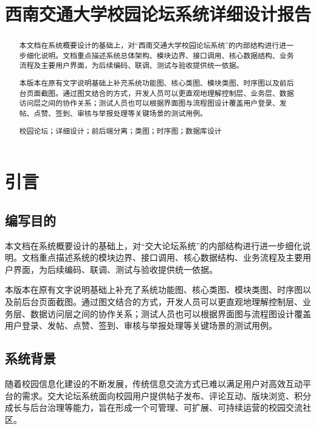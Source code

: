 \documentclass[bwprint]{report}
\title{西南交通大学校园论坛系统详细设计报告}
\begin{document}
\maketitle
\newpage

\pagestyle{plain}

\begin{abstract}
本文档在系统概要设计的基础上，对“西南交通大学校园论坛系统”的内部结构进行进一步细化说明。文档重点描述系统总体架构、模块边界、接口调用、核心数据结构、业务流程及主要用户界面，为后续编码、联调、测试与验收提供统一依据。

本版本在原有文字说明基础上补充系统功能图、核心类图、模块类图、时序图以及前后台页面截图。通过图文结合的方式，开发人员可以更直观地理解控制层、业务层、数据访问层之间的协作关系；测试人员也可以根据界面图与流程图设计覆盖用户登录、发帖、点赞、签到、审核与举报处理等关键场景的测试用例。

\vspace{0.5em}
校园论坛；详细设计；前后端分离；类图；时序图；数据库设计
\end{abstract}

\tableofcontents
\newpage
\listoffigures
\newpage
\pagestyle{plain}
\setcounter{page}{1}

\section{引言}

\subsection{编写目的}

本文档在系统概要设计的基础上，对“交大论坛系统”的内部结构进行进一步细化说明。文档重点描述系统的模块边界、接口调用、核心数据结构、业务流程及主要用户界面，为后续编码、联调、测试与验收提供统一依据。

本版本在原有文字说明基础上补充了系统功能图、核心类图、模块类图、时序图以及前后台页面截图。通过图文结合的方式，开发人员可以更直观地理解控制层、业务层、数据访问层之间的协作关系；测试人员也可以根据界面图与流程图设计覆盖用户登录、发帖、点赞、签到、审核与举报处理等关键场景的测试用例。

\subsection{系统背景}

随着校园信息化建设的不断发展，传统信息交流方式已难以满足用户对高效互动平台的需求。交大论坛系统面向校园用户提供帖子发布、评论互动、版块浏览、积分成长与后台治理等能力，旨在形成一个可管理、可扩展、可持续运营的校园交流社区。
\end{document}
